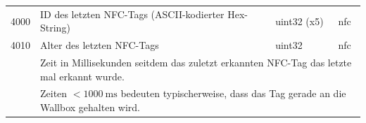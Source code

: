 \documentclass[a4paper,10pt]{article}
\newcommand{\tdesc}[1]{\multicolumn{3}{l}{\footnotesize #1}}
\begin{document}
\begin{tabularx}{\textwidth}{rXll}
4000          & ID des letzten NFC-Tags (ASCII-kodierter Hex-String) & uint32 (x5)  & nfc                                       \\ \cmidrule{2-4}
4010          & Alter des letzten NFC-Tags              & uint32       & nfc                                                    \\
              & \tdesc{Zeit in Milli­sekunden seitdem das zuletzt erkannten NFC-Tag das letzte mal erkannt wurde.}               \\
              & \tdesc{Zeiten $< \SI{1000}{\milli\second}$ bedeuten typischer­weise, dass das Tag gerade an die Wallbox gehalten wird.}             \\ \bottomrule
\end{tabularx}
\normalsize

\newpage
\end{document}

